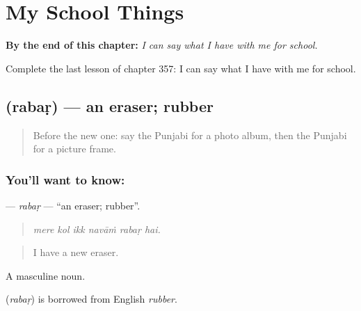 
\chapter{My School Things}
\label{ch:pa-a2-my-school-things}

\begin{chapteropening}
\textbf{By the end of this chapter:} \emph{I can say what I have with me for school.}

Complete the last lesson of chapter 357: I can say what I have with me for school.
\end{chapteropening}

\section[\texorpdfstring{\pa{ਰਬੜ} (rabaṛ)}{ਰਬੜ (rabaṛ)}]{ (rabaṛ) — an eraser; rubber}

\label{lesson:PA-C357-rabar}



\begin{quote}
Before the new one: say the Punjabi for a photo album, then the Punjabi for a picture frame.
\end{quote}

\subsection*{You'll want to know: }
\textbf{} — \emph{rabaṛ} — \textquotedblleft{}an eraser; rubber\textquotedblright{}.

\begin{quote}
     
\end{quote}

\begin{quote}
\emph{mere kol ikk navāṁ rabaṛ hai.}
\end{quote}

\begin{quote}
I have a new eraser.
\end{quote}

A masculine noun.

\begin{cousinweb}
\textbf{} (\emph{rabaṛ}) is borrowed from English \emph{rubber}.
\end{cousinweb}


